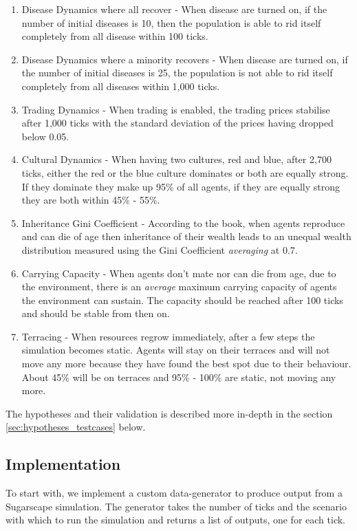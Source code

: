 \begin{enumerate}
	\item Disease Dynamics where all recover - When disease are turned on, if the number of initial diseases is 10, then the population is  able to rid itself completely from all disease within 100 ticks. 
	
	\item Disease Dynamics where a minority recovers - When disease are turned on, if the number of initial diseases is 25, the population is not able to rid itself completely from all diseases within 1,000 ticks.
	
	\item Trading Dynamics - When trading is enabled, the trading prices stabilise after 1,000 ticks with the standard deviation of the prices having dropped below 0.05.
	
	\item Cultural Dynamics - When having two cultures, red and blue, after 2,700 ticks, either the red or the blue culture dominates or both are equally strong. If they dominate they make up 95\% of all agents, if they are equally strong they are both within 45\% - 55\%.
	
	\item Inheritance Gini Coefficient - According to the book, when agents reproduce and can die of age then inheritance of their wealth leads to an unequal wealth distribution measured using the Gini Coefficient \textit{averaging} at 0.7.
	
	\item Carrying Capacity - When agents don't mate nor can die from age, due to the environment, there is an \textit{average} maximum carrying capacity of agents the environment can sustain. The capacity should be reached after 100 ticks and should be stable from then on.
		
	\item Terracing - When resources regrow immediately, after a few steps the simulation becomes static. Agents will stay on their terraces and will not move any more because they have found the best spot due to their behaviour. About 45\% will be on terraces and 95\% - 100\% are static, not moving any more.
\end{enumerate}

The hypotheses and their validation is described more in-depth in the section \ref{sec:hypotheses_testcases} below.

\subsection{Implementation}
To start with, we implement a custom data-generator to produce output from a Sugarscape simulation. The generator takes the number of ticks and the scenario with which to run the simulation and returns a list of outputs, one for each tick.

